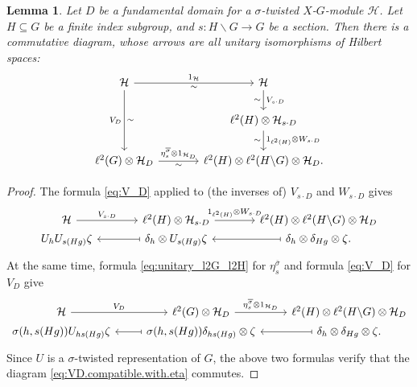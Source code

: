 \documentclass{amsart}
\numberwithin{figure}{section}
\numberwithin{equation}{section}
\numberwithin{table}{section}
\theoremstyle{plain}
\newtheorem{lemma}[equation]{Lemma}
\theoremstyle{definition}
\theoremstyle{remark}
\theoremstyle{nonumber}
\begin{document}
\begin{lemma}\label{lem:VsD.related.to.eta.s}
Let $D$ be a fundamental domain for a \( \sigma \)-twisted
$X$-$G$-module $\mathcal{H}$. Let
$H\subseteq G$ be a finite index subgroup, and $s\colon H\backslash G\to G$
be a section. Then there is a commutative diagram, whose arrows are all
unitary isomorphisms of Hilbert spaces:
\begin{equation}\label{eq:VD.compatible.with.eta}
\begin{tikzcd}[column sep=large]
\mathcal{H} \arrow[r, "1_\mathcal{H}", "\sim"'] \arrow[dd, "V_D"', "\sim"] &
\mathcal{H} \arrow[d, "V_{s\cdot D}", "\sim"']  \\
& 
\ell^2(H)\otimes\mathcal{H}_{s\cdot D} \arrow[d, "1_{\ell^2(H)}\otimes
W_{s\cdot D}", "\sim"'] \\
\ell^2(G)\otimes\mathcal{H}_D \arrow[r, "\eta_s^{\overline{\sigma}}\otimes
1_{\mathcal{H}_D}", "\sim"'] &
\ell^2(H)\otimes\ell^2(H\backslash G)\otimes\mathcal{H}_D.
\end{tikzcd} 
\end{equation}
\end{lemma}
\begin{proof}
The formula \eqref{eq:V_D} applied to (the inverses of) 
$V_{s\cdot D}$ and \( W_{s\cdot D} \) 
gives
\[ 
\begin{tikzcd}[row sep=0, column sep=large]
\mathcal{H} \arrow[r, "V_{s\cdot D}"] &
\ell^2(H)\otimes\mathcal{H}_{s\cdot D} 
\arrow[r, "1_{\ell^2(H)}\otimes W_{s\cdot D}"] & 
\ell^2(H)\otimes\ell^2(H\backslash G)\otimes \mathcal{H}_D \\
U_hU_{s(Hg)}\zeta & \delta_h\otimes U_{s(Hg)}\zeta \arrow[l, maps to] &
\delta_h\otimes \delta_{Hg}\otimes\zeta \arrow[l, maps to]. 
\end{tikzcd}
\]
At the same time, formula \eqref{eq:unitary_l2G_l2H} for $\eta^{\overline{\sigma}}_s$ and formula \eqref{eq:V_D} for $V_D$ give
\begin{equation*}
\begin{tikzcd}[row sep=0]
      \mathcal{H} \ar[r,"V_{D}"]  &  \ell^2(G)\otimes \mathcal{H}_{D} \ar[r,"\eta^{\overline{\sigma}}_{s}\otimes 1_{\mathcal{H}_D}"] & \ell^2(H)\otimes\ell^2(H\backslash G)\otimes\mathcal{H}_{D}  \\
 \sigma(h,s(Hg))U_{hs(Hg)}\zeta & \sigma(h,s(Hg))\delta_{hs(Hg)}\otimes\zeta \ar[l,mapsto] & \delta_h\otimes\delta_{Hg}\otimes\zeta \ar[l,mapsto] .
\end{tikzcd}
\end{equation*}
Since $U$ is a $\sigma$-twisted representation of $G$, the above two formulas verify that the diagram
\eqref{eq:VD.compatible.with.eta} commutes.
\end{proof}
\end{document}
